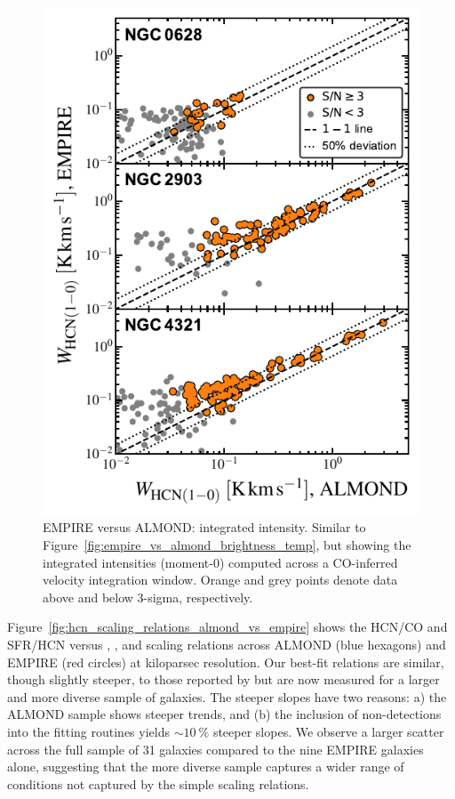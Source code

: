 \documentclass[letter, longauth]{aa} %
\begin{document}
\begin{appendix}
\begin{figure}
\centering
\includegraphics[width=\columnwidth]{Figures/ALMOND_vs_EMPIRE_integrated_intensities_compressed_v2.pdf}
\caption{EMPIRE versus ALMOND: \hcnone integrated intensity.
Similar to Figure~\ref{fig:empire_vs_almond_brightness_temp}, but showing the integrated intensities (moment-0) computed across a CO-inferred velocity integration window.
Orange and grey points denote data above and below 3-sigma, respectively.
}
\label{fig:empire_vs_almond_intensity}
\end{figure}


Figure~\ref{fig:hcn_scaling_relations_almond_vs_empire} shows the HCN/CO and SFR/HCN versus \sigstar, \sigmol, and \pde scaling relations across ALMOND (blue hexagons) and EMPIRE (red circles) at kiloparsec resolution.
Our best-fit relations are similar, though slightly steeper, to those reported by \citet{Jimenez-Donaire2019} but are now measured for a larger and more diverse sample of galaxies. The steeper slopes have two reasons: a) the ALMOND sample shows steeper trends, and (b) the inclusion of non-detections into the fitting routines yields $\sim\SI{10}{\percent}$ steeper slopes. We observe a larger scatter across the full sample of 31 galaxies compared to the nine EMPIRE galaxies alone, suggesting that the more diverse sample captures a wider range of conditions not captured by the simple scaling relations.


\end{appendix}
\end{document}
